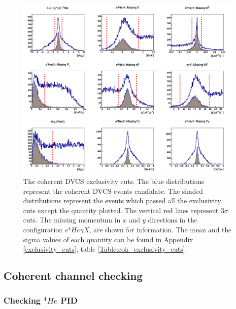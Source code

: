 \begin{figure}[!h]
\centering
\includegraphics[scale=0.4]{fig_dvcs/all_coh_exc_cuts.png}
\caption{The coherent DVCS exclusivity cuts. The blue distributions represent the coherent DVCS events candidate. The shaded distributions represent the events which passed all the exclusivity cuts except the quantity plotted. The vertical red lines represent $3\sigma$ cuts. The missing momentum in $x$ and $y$ directions in the configuration $e^{4}He\gamma X$, are shown for information. The mean and the sigma values of each quantity can be found in Appendix \ref{exclusivity_cuts}, table \ref{Table:coh_exclusivity_cuts}.} 
\label{fig:coh_exclusivty_cuts}
\end{figure}

\subsection{Coherent channel checking}

\subsubsection{Checking $^{4}He$ PID}

